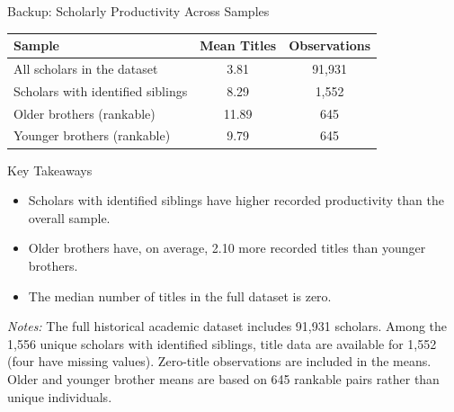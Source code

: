 \documentclass[aspectratio=169,10pt]{beamer}
\begin{document}
\begin{frame}{Backup: Scholarly Productivity Across Samples}

\small

\begin{table}
\centering
\begin{tabular}{lcc}
\hline
\textbf{Sample} &
\textbf{Mean Titles} &
\textbf{Observations} \\
\hline
All scholars in the dataset       & 3.81  & 91,931 \\
Scholars with identified siblings & 8.29  & 1,552 \\
Older brothers (rankable)         & 11.89 & 645 \\
Younger brothers (rankable)       & 9.79  & 645 \\
\hline
\end{tabular}
\end{table}

\vspace{0.35cm}

\begin{block}{Key Takeaways}
\begin{itemize}
    \item Scholars with identified siblings have higher
    recorded productivity than the overall sample.
    \item Older brothers have, on average, 2.10 more
    recorded titles than younger brothers.
    \item The median number of titles in the full
    dataset is zero.
\end{itemize}
\end{block}

\vspace{0.15cm}

{\scriptsize
\textit{Notes:} The full historical academic dataset
includes 91,931 scholars. Among the 1,556 unique
scholars with identified siblings, title data are
available for 1,552 (four have missing values).
Zero-title observations are included in the means.
Older and younger brother means are based on
645 rankable pairs rather than unique individuals.
}

\end{frame}
\end{document}
